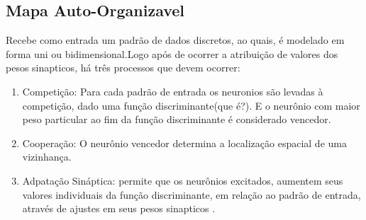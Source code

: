 \subsection {Mapa Auto-Organizavel}
\quad Recebe como entrada um padrão de dados discretos, ao quais, é modelado em forma uni ou bidimensional.Logo após de ocorrer a atribuição de valores dos pesos sinapticos, há três processos que devem ocorrer:
\begin {enumerate}

	\item Competição: Para cada padrão de entrada os neuronios são levadas à competição, dado uma função discriminante(que é?). E o neurônio com maior peso particular ao fim da função discriminante é considerado vencedor.
	\item Cooperação: O neurônio vencedor determina a localização espacial de uma vizinhança.
	\item Adpatação Sináptica: permite que os neurônios excitados, aumentem seus valores individuais da função discriminante, em relação ao padrão de entrada, através de ajustes em seus pesos sinapticos .
\end{enumerate}

